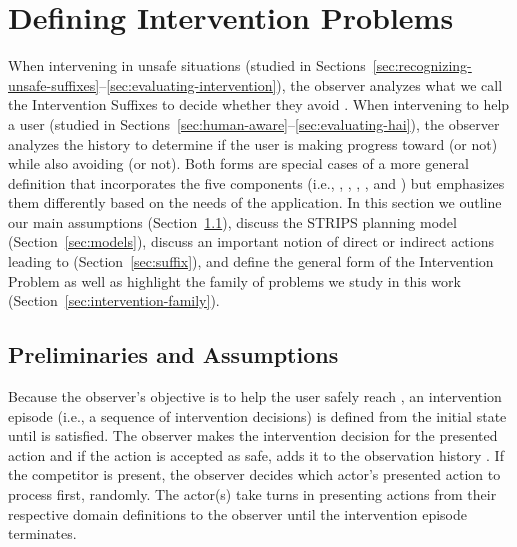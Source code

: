 \section{Defining Intervention Problems}
\label{sec:intervention-problem}
When intervening in unsafe situations (studied in Sections~\ref{sec:recognizing-unsafe-suffixes}--\ref{sec:evaluating-intervention}), the observer analyzes what we call the  Intervention Suffixes \Suffixes to decide whether they avoid \undesired.
When intervening to help a user (studied in Sections~\ref{sec:human-aware}--\ref{sec:evaluating-hai}), the observer analyzes the history \historyDef to determine if the user is making progress toward \desired (or not) while also avoiding \undesired (or not). 
Both forms are special cases of a more general definition that incorporates the five components (i.e., \desired, \undesired, \historyDef, \presentedAction, and \Suffixes) but emphasizes them differently based on the needs of the application.
In this section we outline our main assumptions (Section~\ref{sec:unsafe-suffix-prelim}), discuss the STRIPS planning model (Section~\ref{sec:models}), discuss an important notion of direct or indirect actions leading to \undesired (Section~\ref{sec:suffix}), and define the general form of the Intervention Problem as well as highlight the family of problems we study in this work (Section~\ref{sec:intervention-family}).

\subsection{Preliminaries and Assumptions}
\label{sec:unsafe-suffix-prelim}
Because the observer's objective is to help the user safely reach \desired, an intervention episode (i.e., a sequence of intervention decisions) is defined from the initial state \initialState until \desired is satisfied.
The observer makes the intervention decision for the presented action and if the action is accepted as safe, 
adds it to the observation history \historyDef. 
If the competitor is present, the observer decides which actor's presented action to process first, randomly. 
The actor(s) take turns in presenting actions from their respective domain definitions to the observer until the intervention episode terminates.


